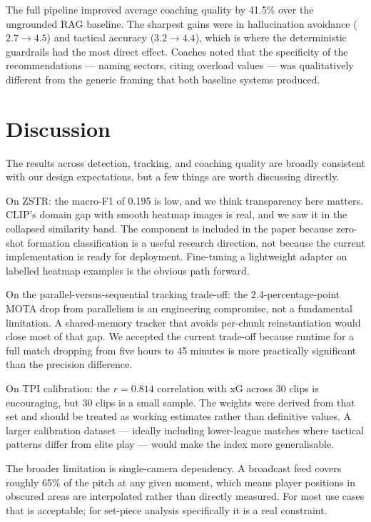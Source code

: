 \documentclass[conference]{IEEEtran}
\begin{document}
The full pipeline improved average coaching quality by 41.5\% over the ungrounded RAG baseline. The sharpest gains were in hallucination avoidance ($2.7 \to 4.5$) and tactical accuracy ($3.2 \to 4.4$), which is where the deterministic guardrails had the most direct effect. Coaches noted that the specificity of the recommendations --- naming sectors, citing overload values --- was qualitatively different from the generic framing that both baseline systems produced.

\section{Discussion}
\label{sec:discussion}

The results across detection, tracking, and coaching quality are broadly consistent with our design expectations, but a few things are worth discussing directly.

On ZSTR: the macro-F1 of 0.195 is low, and we think transparency here matters. CLIP's domain gap with smooth heatmap images is real, and we saw it in the collapsed similarity band. The component is included in the paper because zero-shot formation classification is a useful research direction, not because the current implementation is ready for deployment. Fine-tuning a lightweight adapter on labelled heatmap examples is the obvious path forward.

On the parallel-versus-sequential tracking trade-off: the 2.4-percentage-point MOTA drop from parallelism is an engineering compromise, not a fundamental limitation. A shared-memory tracker that avoids per-chunk reinstantiation would close most of that gap. We accepted the current trade-off because runtime for a full match dropping from five hours to 45 minutes is more practically significant than the precision difference.

On TPI calibration: the $r = 0.814$ correlation with xG across 30 clips is encouraging, but 30 clips is a small sample. The weights were derived from that set and should be treated as working estimates rather than definitive values. A larger calibration dataset --- ideally including lower-league matches where tactical patterns differ from elite play --- would make the index more generalisable.

The broader limitation is single-camera dependency. A broadcast feed covers roughly 65\% of the pitch at any given moment, which means player positions in obscured areas are interpolated rather than directly measured. For most use cases that is acceptable; for set-piece analysis specifically it is a real constraint.
\end{document}
